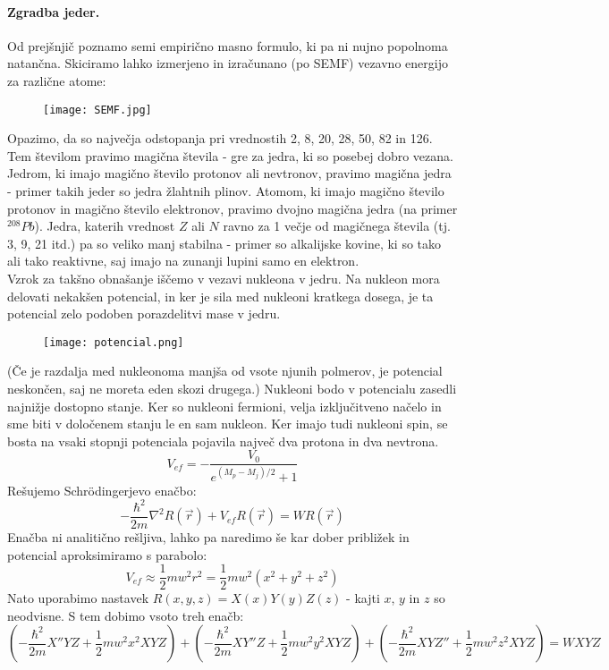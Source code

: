 \documentclass[a4paper]{article}
\newcommand{\vct}[1]{\overrightarrow{#1}}
\begin{document}
\paragraph{Zgradba jeder.} Od prejšnjič poznamo semi empirično masno formulo, ki pa ni nujno popolnoma natančna.
Skiciramo lahko izmerjeno in izračunano (po SEMF) vezavno energijo za različne atome:
\begin{figure}[h!]
    \centering
    \texttt{[image: SEMF.jpg]}
\end{figure}
Opazimo, da so največja odstopanja pri vrednostih 2, 8, 20, 28, 50, 82 in 126. Tem številom pravimo magična števila - gre za jedra, ki so posebej dobro vezana.
Jedrom, ki imajo magično število protonov ali nevtronov, pravimo magična jedra - primer takih jeder so jedra žlahtnih plinov. Atomom, ki imajo magično število protonov in magično število elektronov, pravimo
dvojno magična jedra (na primer $^{208}Pb$). Jedra, katerih vrednost $Z$ ali $N$ ravno za 1 večje od magičnega števila (tj. 3, 9, 21 itd.) pa so veliko manj stabilna - primer so alkalijske kovine,
ki so tako ali tako reaktivne, saj imajo na zunanji lupini samo en elektron. \\[2mm]
Vzrok za takšno obnašanje iščemo v vezavi nukleona v jedru. Na nukleon mora delovati nekakšen potencial, in ker je sila med nukleoni kratkega dosega, je ta potencial zelo podoben porazdelitvi mase v jedru.
\begin{figure}[h!]
    \centering
    \texttt{[image: potencial.png]}
\end{figure}
(Če je razdalja med nukleonoma manjša od vsote njunih polmerov, je potencial neskončen, saj ne moreta eden skozi drugega.)
Nukleoni bodo v potencialu zasedli najnižje dostopno stanje. Ker so nukleoni fermioni, velja izključitveno načelo in sme biti v določenem stanju le en sam
nukleon. Ker imajo tudi nukleoni spin, se bosta na vsaki stopnji potenciala pojavila največ dva protona in dva nevtrona.
$$V_{ef} = - \frac{V_0}{e^{(M_p - M_j)/2} + 1}$$
Rešujemo Schrödingerjevo enačbo:
$$-\frac{\hbar^2}{2m}\nabla^2R(\vct{r}) + V_{ef}R(\vct{r}) = WR(\vct{r})$$
Enačba ni analitično rešljiva, lahko pa naredimo še kar dober približek in potencial aproksimiramo s parabolo:
$$V_{ef} \approx \frac{1}{2}mw^2r^2 = \frac{1}{2}mw^2(x^2 + y^2 + z^2)$$
Nato uporabimo nastavek $\displaystyle{R(x, y, z) = X(x)Y(y)Z(z)}$ - kajti $x$, $y$ in $z$ so neodvisne.
S tem dobimo vsoto treh enačb:
$$\left(-\frac{\hbar^2}{2m}X''YZ + \frac{1}{2}mw^2x^2XYZ\right) + \left(-\frac{\hbar^2}{2m}XY''Z + \frac{1}{2}mw^2y^2XYZ\right) + \left(-\frac{\hbar^2}{2m}XYZ'' + \frac{1}{2}mw^2z^2XYZ\right) = WXYZ$$
\end{document}
